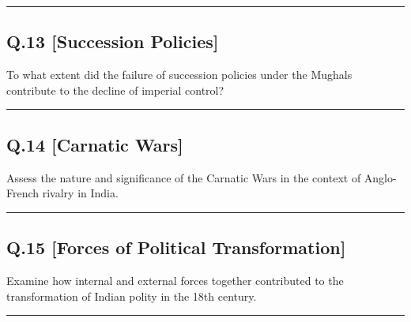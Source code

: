 \documentclass[14pt,a4paper]{extarticle}
\newcommand{\answerspace}[1]{%
    \vspace{#1}
    \noindent\rule{\linewidth}{0.4pt}
}
\begin{document}
\answerspace{5cm}

\subsection*{Q.13 [Succession Policies]}
To what extent did the failure of succession policies under the Mughals contribute to the decline of imperial control?

\answerspace{5cm}

\subsection*{Q.14 [Carnatic Wars]}
Assess the nature and significance of the Carnatic Wars in the context of Anglo-French rivalry in India.

\answerspace{6cm}

\subsection*{Q.15 [Forces of Political Transformation]}
Examine how internal and external forces together contributed to the transformation of Indian polity in the 18th century.

\answerspace{6cm}
\end{document}

